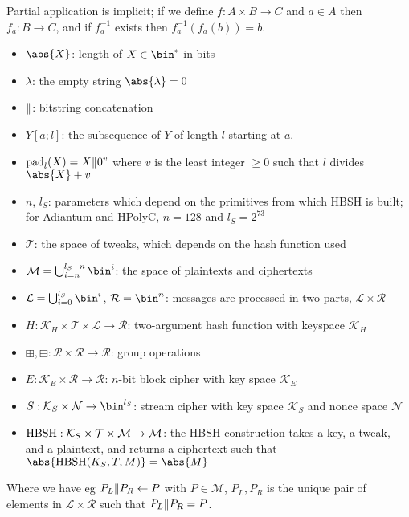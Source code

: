\documentclass[eprint.tex]{subfiles}
\begin{document}
Partial application is implicit; if we define $f: A \times B \rightarrow C$ and
$a \in A$ then $f_a: B \rightarrow C$, and if $f_a^{-1}$ exists then $f_a^{-1}(f_a(b)) = b$.
\begin{itemize}
    \item $\abs{X}$: length of $X \in \bin^{*}$ in bits
    \item $\lambda$: the empty string $\abs{\lambda} = 0$
    \item $\Vert$: bitstring concatenation
    \item $Y[a;l]$: the subsequence of $Y$ of length $l$ starting at $a$.
    \item $\operatorname{pad}_l(X) = X \Vert 0^v$
    where $v$ is the least integer $\geq 0$ such that $l$ divides $\abs{X} + v$
    \item $n$, $l_S$: parameters which depend on the
    primitives from which HBSH is built;
    for Adiantum and HPolyC, $n = 128$ and $l_S = 2^{73}$
    \item $\mathcal{T}$: the
    space of tweaks, which depends on the hash function used
    \item $\mathcal{M} = \bigcup_{i=n}^{l_S + n}\bin^i$: the
    space of plaintexts and ciphertexts
    \item $\mathcal{L} = \bigcup_{i=0}^{l_S}\bin^i$, $\mathcal{R} = \bin^n$:
    messages are processed in two parts,
    $\mathcal{L} \times \mathcal{R}$
    \item $H: \mathcal{K}_H \times \mathcal{T} \times \mathcal{L} \rightarrow \mathcal{R}$:
    two-argument hash function with keyspace $\mathcal{K}_H$
    \item $\boxplus, \boxminus: \mathcal{R} \times \mathcal{R} \rightarrow \mathcal{R}$:
    group operations
    \item $E: \mathcal{K}_E \times \mathcal{R} \rightarrow \mathcal{R}$:
    $n$-bit block cipher with key space $\mathcal{K}_E$
    \item $S: \mathcal{K}_S \times \mathcal{N} \rightarrow \bin^{l_S}$:
    stream cipher with key space $\mathcal{K}_S$
    and nonce space $\mathcal{N}$
    \item $\operatorname{HBSH} : \mathcal{K}_S \times \mathcal{T} \times \mathcal{M} \rightarrow \mathcal{M}$:
    the HBSH construction takes a key, a tweak, and a plaintext,
    and returns a ciphertext
    such that $\abs{\HBSH(K_S, T, M)} = \abs{M}$
\end{itemize}
Where we have eg $P_L \Vert P_R \gets P$
with $P \in \mathcal{M}$, $P_L, P_R$ is the unique
pair of elements in $\mathcal{L} \times \mathcal{R}$ such that
$P_L \Vert P_R = P$.
\end{document}
